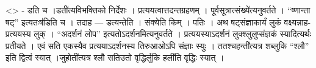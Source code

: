 \textless{}\textgreater{} - डति च ।डती॑त्यविभक्तिको निर्देशः ।
प्रत्ययत्वात्तदन्तग्रहणम् । पूर्वसूत्रात्संख्ये॑त्यनुवर्तते । ``ष्णान्ता
षट्'' इत्यतःष॑डिति च । तदाह --- डत्यन्तेति । संक्येति किम् । पतिः । अथ
षट्संज्ञाकार्यं लुकं वक्ष्यन्नाह-प्रत्ययस्य लुक् । ``अदर्शनं लोप''
इत्यतोऽदर्शनमित्यनुवर्तते । प्रत्ययस्याऽदर्शनं लुक्श्लुलुप्संज्ञकं
स्यादित्यर्थः प्रतीयते । एवं सति एकस्यैव प्रत्ययाऽदर्शनस्य तिरुआओऽपि
संज्ञाः स्युः । ततश्चहन्ती॑त्यत्र शब्लुकि ``श्लौ'' इति द्वित्वं स्यात्
।जुहोती॑त्यत्र श्लौ सतिउतो वृद्धिर्लुकि हली॑ति वृद्धिः स्यात् ।
